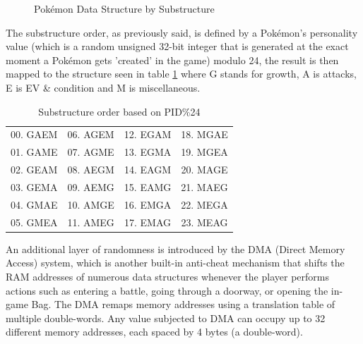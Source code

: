\documentclass[a4paper]{usiinfbachelorproject}
\begin{document}
\begin{figure}[h!]
	\caption{Pokémon Data Structure by Substructure}
	\label{fig:pokemon-data-structure}
\end{figure}

The substructure order, as previously said, is defined by a Pokémon's personality value (which is a random unsigned 32-bit integer that is generated at the exact moment a Pokémon gets 'created' in the game) modulo 24, the result is then mapped to the structure seen in table \ref{tab:substructure-order} where G stands for growth, A is attacks, E is EV \& condition and M is miscellaneous.

\begin{table}[h!]
	\centering
	\begin{tabular}{cccc}
		\toprule
		00. GAEM & 06. AGEM & 12. EGAM & 18. MGAE \\
		01. GAME & 07. AGME & 13. EGMA & 19. MGEA \\
		02. GEAM & 08. AEGM & 14. EAGM & 20. MAGE \\
		03. GEMA & 09. AEMG & 15. EAMG & 21. MAEG \\
		04. GMAE & 10. AMGE & 16. EMGA & 22. MEGA \\
		05. GMEA & 11. AMEG & 17. EMAG & 23. MEAG \\
		\bottomrule
	\end{tabular}
	\caption{Substructure order based on PID\%24}
	\label{tab:substructure-order}
\end{table}

\newpage

An additional layer of randomness is introduced by the DMA (Direct Memory Access) system, which is another built-in anti-cheat mechanism that shifts the RAM addresses of numerous data structures whenever the player performs actions such as entering a battle, going through a doorway, or opening the in-game Bag. The DMA remaps memory addresses using a translation table of multiple double-words. Any value subjected to DMA can occupy up to 32 different memory addresses, each spaced by 4 bytes (a double-word).
\end{document}
